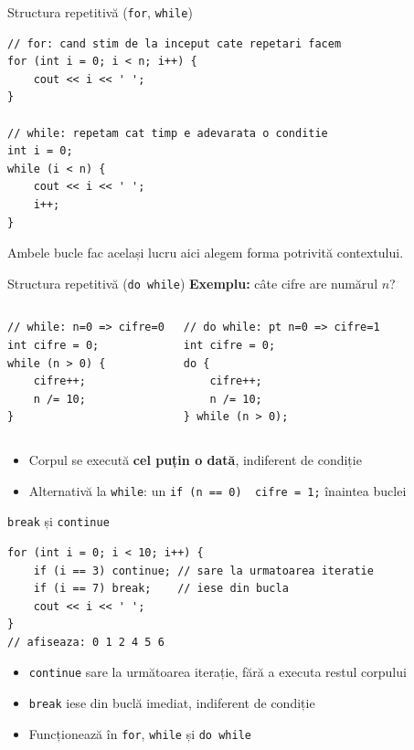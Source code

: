 ﻿\documentclass{beamer}
\begin{document}
\begin{frame}[fragile]{Structura repetitivă (\texttt{for}, \texttt{while})}
  \begin{lstlisting}
// for: cand stim de la inceput cate repetari facem
for (int i = 0; i < n; i++) {
    cout << i << ' ';
}

// while: repetam cat timp e adevarata o conditie
int i = 0;
while (i < n) {
    cout << i << ' ';
    i++;
}
  \end{lstlisting}
  Ambele bucle fac același lucru aici \textemdash{} alegem forma potrivită contextului.
\end{frame}

\begin{frame}[fragile]{Structura repetitivă (\texttt{do while})}
  \textbf{Exemplu:} câte cifre are numărul $n$?

  \begin{columns}[T]
    \begin{lstlisting}
// while: n=0 => cifre=0
int cifre = 0;
while (n > 0) {
    cifre++;
    n /= 10;
}
    \end{lstlisting}
    \begin{lstlisting}
// do while: pt n=0 => cifre=1
int cifre = 0;
do {
    cifre++;
    n /= 10;
} while (n > 0);
    \end{lstlisting}
  \end{columns}

  \begin{itemize}
    \item Corpul se execută \textbf{cel puțin o dată}, indiferent de condiție
    \item Alternativă la \lstinline|while|: un \lstinline|if (n == 0)  cifre = 1;| înaintea buclei
  \end{itemize}
\end{frame}

\begin{frame}[fragile]{\texttt{break} și \texttt{continue}}
  \begin{lstlisting}
for (int i = 0; i < 10; i++) {
    if (i == 3) continue; // sare la urmatoarea iteratie
    if (i == 7) break;    // iese din bucla
    cout << i << ' ';
}
// afiseaza: 0 1 2 4 5 6
  \end{lstlisting}
  \begin{itemize}
    \item \lstinline|continue| \textemdash{} sare la următoarea iterație, fără a executa restul corpului
    \item \lstinline|break| \textemdash{} iese din buclă imediat, indiferent de condiție
    \item Funcționează în \lstinline|for|, \lstinline|while| și \lstinline|do while|
  \end{itemize}
\end{frame}
\end{document}
